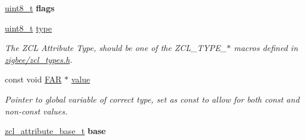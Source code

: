 \begin{DoxyCompactItemize}
\item 
\hypertarget{group__zcl_gaa2585d779da0ab21273a8d92de9a0ebe}{\hyperlink{group__hal_gae1affc9ca37cfb624959c866a73f83c2}{uint8\-\_\-t} {\bfseries flags}}\label{group__zcl_gaa2585d779da0ab21273a8d92de9a0ebe}

\item 
\hypertarget{group__zcl_ga1d127017fb298b889f4ba24752d08b8e}{\hyperlink{group__hal_gae1affc9ca37cfb624959c866a73f83c2}{uint8\-\_\-t} \hyperlink{group__zcl_ga1d127017fb298b889f4ba24752d08b8e}{type}}\label{group__zcl_ga1d127017fb298b889f4ba24752d08b8e}

\begin{DoxyCompactList}\small\item\em The Z\-C\-L Attribute Type, should be one of the Z\-C\-L\-\_\-\-T\-Y\-P\-E\-\_\-$\ast$ macros defined in \hyperlink{zcl__types_8h}{zigbee/zcl\-\_\-types.\-h}. \end{DoxyCompactList}\item 
const void \hyperlink{group__hal_gaef060b3456fdcc093a7210a762d5f2ed}{F\-A\-R} $\ast$ \hyperlink{group__zcl_gaaaa0b89997c57cfca2dfae40f46e702d}{value}
\begin{DoxyCompactList}\small\item\em Pointer to global variable of correct type, set as {\ttfamily const} to allow for both const and non-\/const values. \end{DoxyCompactList}\item 
\hypertarget{group__zcl_ga8f041b4b145b30d5f92acdcb08ba43a3}{\hyperlink{structzcl__attribute__base__t}{zcl\-\_\-attribute\-\_\-base\-\_\-t} {\bfseries base}}\label{group__zcl_ga8f041b4b145b30d5f92acdcb08ba43a3}


\end{DoxyCompactItemize}
